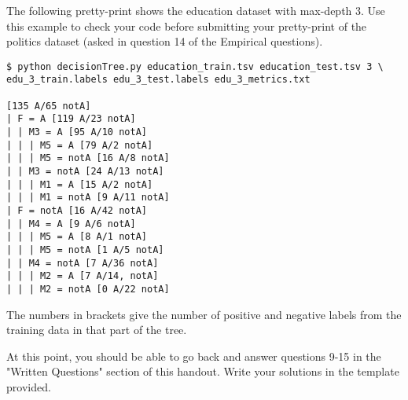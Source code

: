 The following pretty-print shows the education dataset with max-depth 3.  Use this example to check your code before submitting your pretty-print of the politics dataset (asked in question 14 of the Empirical questions).  

\begin{lstlisting}[language=Shell]
$ python decisionTree.py education_train.tsv education_test.tsv 3 \
edu_3_train.labels edu_3_test.labels edu_3_metrics.txt

[135 A/65 notA]
| F = A [119 A/23 notA]
| | M3 = A [95 A/10 notA]
| | | M5 = A [79 A/2 notA]
| | | M5 = notA [16 A/8 notA]
| | M3 = notA [24 A/13 notA]
| | | M1 = A [15 A/2 notA]
| | | M1 = notA [9 A/11 notA]
| F = notA [16 A/42 notA]
| | M4 = A [9 A/6 notA]
| | | M5 = A [8 A/1 notA]
| | | M5 = notA [1 A/5 notA]
| | M4 = notA [7 A/36 notA]
| | | M2 = A [7 A/14, notA]
| | | M2 = notA [0 A/22 notA]
\end{lstlisting}

The numbers in brackets give the number of positive and negative labels from the training data in that part of the tree.

\begin{notebox}
At this point, you should be able to go back and answer questions 9-15 in the "Written Questions" section of this handout.  Write your solutions in the template provided. 
\end{notebox}

